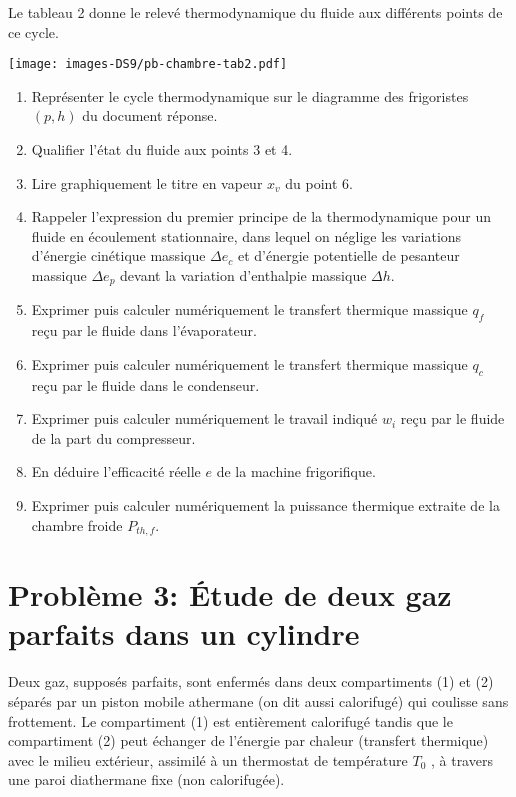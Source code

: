 \documentclass[
  10pt,
  french,
  a4paper,
  DIV=18]{scrartcl}
\begin{document}
Le tableau 2 donne le relevé thermodynamique du fluide aux différents
points de ce cycle.

\begin{center}

\texttt{[image: images-DS9/pb-chambre-tab2.pdf]}

\end{center}

\begin{enumerate}
\def\labelenumi{\arabic{enumi}.}
\setcounter{enumi}{5}
\item
  Représenter le cycle thermodynamique sur le diagramme des frigoristes
  \((p,h)\) du document réponse.
\item
  Qualifier l'état du fluide aux points 3 et 4.
\item
  Lire graphiquement le titre en vapeur \(x_v\) du point 6.
\item
  Rappeler l'expression du premier principe de la thermodynamique pour
  un fluide en écoulement stationnaire, dans lequel on néglige les
  variations d'énergie cinétique massique \(\Delta e_c\) et d'énergie
  potentielle de pesanteur massique \(\Delta e_p\) devant la variation
  d'enthalpie massique \(\Delta h\).
\item
  Exprimer puis calculer numériquement le transfert thermique massique
  \(q_f\) reçu par le fluide dans l'évaporateur.
\item
  Exprimer puis calculer numériquement le transfert thermique massique
  \(q_c\) reçu par le fluide dans le condenseur.
\item
  Exprimer puis calculer numériquement le travail indiqué \(w_i\) reçu
  par le fluide de la part du compresseur.
\item
  En déduire l'efficacité réelle \(e\) de la machine frigorifique.
\item
  Exprimer puis calculer numériquement la puissance thermique extraite
  de la chambre froide \(P_{th,f}\).
\end{enumerate}

\newpage

\section*{Problème 3: Étude de deux gaz parfaits dans un
cylindre}\label{probluxe8me-3-uxe9tude-de-deux-gaz-parfaits-dans-un-cylindre}

Deux gaz, supposés parfaits, sont enfermés dans deux compartiments (1)
et (2) séparés par un piston mobile athermane (on dit aussi calorifugé)
qui coulisse sans frottement. Le compartiment (1) est entièrement
calorifugé tandis que le compartiment (2) peut échanger de l'énergie par
chaleur (transfert thermique) avec le milieu extérieur, assimilé à un
thermostat de température \(T_0\) , à travers une paroi diathermane fixe
(non calorifugée).
\end{document}
